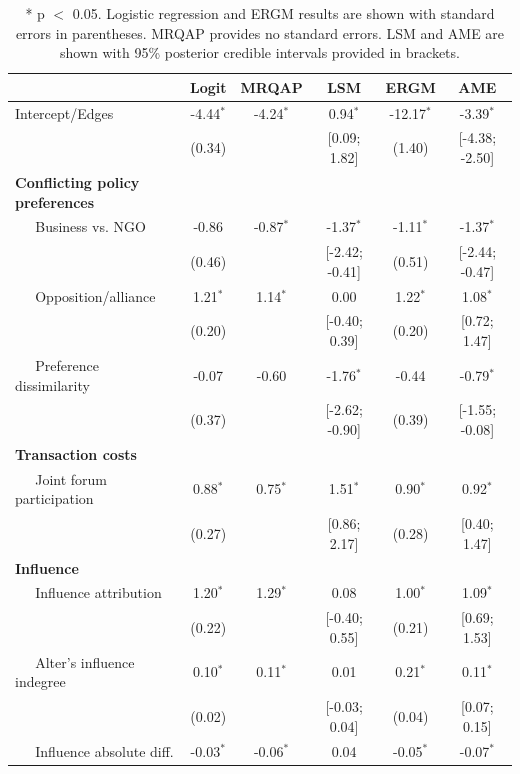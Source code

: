 \documentclass[9pt,twocolumn,twoside,lineno]{pnas-new}
\begin{document}
\begin{table}[ht]
\centering
\begingroup\normalsize
\caption{* p $<$ 0.05. Logistic regression and ERGM results are shown with standard errors in parentheses. MRQAP provides no standard errors. LSM and AME are shown with 95\% posterior credible intervals provided in brackets.}
\begin{tabular}{lccccc}
   & Logit & MRQAP & LSM & ERGM & AME \\
  \hline
\hline
Intercept/Edges & -4.44$^{\ast}$ & -4.24$^{\ast}$ & 0.94$^{\ast}$ & -12.17$^{\ast}$ & -3.39$^{\ast}$ \\
   & (0.34) &  & [0.09; 1.82] & (1.40) & [-4.38; -2.50] \\
  \textbf{Conflicting policy preferences} &  &  &  &  &  \\
  $\;\;\;\;$ Business vs. NGO & -0.86 & -0.87$^{\ast}$ & -1.37$^{\ast}$ & -1.11$^{\ast}$ & -1.37$^{\ast}$ \\
   & (0.46) &  & [-2.42; -0.41] & (0.51) & [-2.44; -0.47] \\
  $\;\;\;\;$ Opposition/alliance & 1.21$^{\ast}$ & 1.14$^{\ast}$ & 0.00 & 1.22$^{\ast}$ & 1.08$^{\ast}$ \\
   & (0.20) &  & [-0.40; 0.39] & (0.20) & [0.72; 1.47] \\
  $\;\;\;\;$ Preference dissimilarity & -0.07 & -0.60 & -1.76$^{\ast}$ & -0.44 & -0.79$^{\ast}$ \\
   & (0.37) &  & [-2.62; -0.90] & (0.39) & [-1.55; -0.08] \\
  \textbf{Transaction costs} &  &  &  &  &  \\
  $\;\;\;\;$ Joint forum participation & 0.88$^{\ast}$ & 0.75$^{\ast}$ & 1.51$^{\ast}$ & 0.90$^{\ast}$ & 0.92$^{\ast}$ \\
   & (0.27) &  & [0.86; 2.17] & (0.28) & [0.40; 1.47] \\
  \textbf{Influence} &  &  &  &  &  \\
  $\;\;\;\;$ Influence attribution & 1.20$^{\ast}$ & 1.29$^{\ast}$ & 0.08 & 1.00$^{\ast}$ & 1.09$^{\ast}$ \\
   & (0.22) &  & [-0.40; 0.55] & (0.21) & [0.69; 1.53] \\
  $\;\;\;\;$ Alter's influence indegree & 0.10$^{\ast}$ & 0.11$^{\ast}$ & 0.01 & 0.21$^{\ast}$ & 0.11$^{\ast}$ \\
   & (0.02) &  & [-0.03; 0.04] & (0.04) & [0.07; 0.15] \\
  $\;\;\;\;$ Influence absolute diff. & -0.03$^{\ast}$ & -0.06$^{\ast}$ & 0.04 & -0.05$^{\ast}$ & -0.07$^{\ast}$ \\

\end{tabular}
\end{table}
\end{document}
